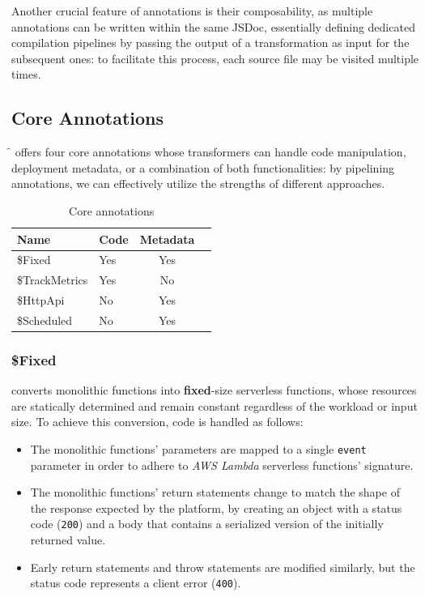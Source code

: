 Another crucial feature of annotations is their composability,
as multiple annotations can be written within the same JSDoc,
essentially defining dedicated compilation pipelines by passing the output
of a transformation as input for the subsequent ones:
to facilitate this process, each source file may be visited multiple times.

\subsection{Core Annotations}

\f{} offers four core annotations whose transformers can handle code manipulation,
deployment metadata, or a combination of both functionalities:
by pipelining annotations, we can effectively utilize the strengths of different approaches.

\begin{table}[htbp]
    \centering
    \caption{Core annotations}
    \begin{tabular}{llcc}
        \toprule
        \textbf{Name} & \textbf{Code} & \textbf{Metadata} \\
        \midrule
        \$Fixed & Yes & Yes \\
        \$TrackMetrics & Yes & No \\
        \$HttpApi & No & Yes \\
        \$Scheduled & No & Yes \\
        \bottomrule
    \end{tabular}
\end{table}

\subsubsection{\$Fixed}
converts monolithic functions into \textbf{fixed}-size serverless functions,
whose resources are statically determined and remain constant regardless of the workload or input size.
To achieve this conversion, code is handled as follows:
\begin{itemize}
  \item The monolithic functions' parameters are mapped to a single \verb|event|
    parameter in order to adhere to \textit{AWS Lambda} serverless functions' signature.
  \item The monolithic functions' return statements change to match
    the shape of the response expected by the platform,
    by creating an object with a status code (\verb|200|)
    and a body that contains a serialized version of the initially returned value.
  \item Early return statements and throw statements are modified similarly,
    but the status code represents a client error (\verb|400|).
\end{itemize}

